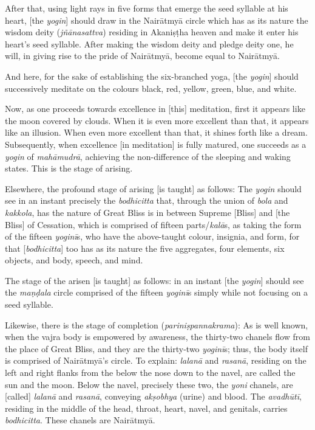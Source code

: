 \documentclass[naipra.tex]{subfiles}
\begin{document}
After that, using light rays in five forms that emerge the seed syllable at his heart, [the \emph{yogin}] should draw in the Nairātmyā circle which has as its nature the wisdom deity (\emph{jñānasattva}) residing in Akaniṣṭha heaven and make it enter his heart's seed syllable.
After making the wisdom deity and pledge deity one, he will, in giving rise to the pride of Nairātmyā, become equal to Nairātmyā.

And here, for the sake of establishing the six-branched yoga, [the \emph{yogin}] should successively meditate on the colours black, red, yellow, green, blue, and white.

Now, as one proceeds towards excellence in [this] meditation, first it appears like the moon covered by clouds.
When it is even more excellent than that, it appears like an illusion.
When even more excellent than that, it shines forth like a dream.
Subsequently, when excellence [in meditation] is fully matured, one succeeds as a \emph{yogin} of \emph{mahāmudrā}, achieving the non-difference of the sleeping and waking states.
This is the stage of arising.

Elsewhere, the profound stage of arising [is taught] as follows: The \emph{yogin} should see in an instant precisely the \emph{bodhicitta} that, through the union of \emph{bola} and \emph{kakkola}, has the nature of Great Bliss is in between Supreme [Bliss] and [the Bliss] of Cessation, which is comprised of fifteen parts/\emph{kalā}s, as taking the form of the fifteen \emph{yoginī}s, who have the above-taught colour, insignia, and form, for that [\emph{bodhicitta}] too has as its nature the five aggregates, four elements, six objects, and body, speech, and mind.

The stage of the arisen [is taught] as follows: in an instant [the \emph{yogin}] should see the \emph{maṇḍala} circle comprised of the fifteen \emph{yoginī}s simply while \crux not \crux focusing on a seed syllable.

Likewise, there is the stage of completion (\emph{pariniṣpannakrama}):
As is well known, when the vajra body is empowered by awareness, the thirty-two chanels flow from the place of Great Bliss, and they are the thirty-two \emph{yoginī}s; thus, the body itself is comprised of Nairātmyā's circle.
To explain: \emph{lalanā} and \emph{rasanā}, residing on the left and right flanks from the below the nose down to the navel, are called the sun and the moon.
Below the navel, precisely these two, the \emph{yoni} chanels, are [called] \emph{lalanā} and \emph{rasanā}, conveying \emph{akṣobhya} (urine) and blood.
The \emph{avadhūtī}, residing in the middle of the head, throat, heart, navel, and genitals, carries \emph{bodhicitta}.
These chanels are Nairātmyā.
\end{document}
